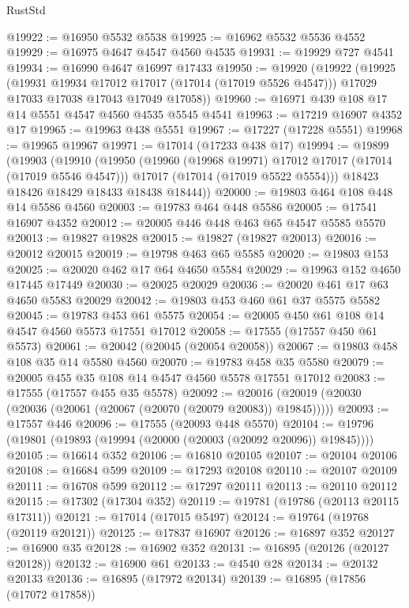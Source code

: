 \begin{lexlean}{RustStd}
\begin{coremodule}
{\begin{coremodule}
{{{{{{{{{{{{{{{{{{{{{{{{{{{{{{{{{{{{{{{{{{{{{{{{{{{{{{{@19922 := @16950 @5532 @5538
@19925 := @16962 @5532 @5536 @4552
@19929 := @16975 @4647 @4547 @4560 @4535
@19931 := @19929 @727 @4541
@19934 := @16990 @4647 @16997 @17433
@19950 := @19920
    (@19922
      (@19925
        (@19931 @19934 @17012 @17017 (@17014 (@17019 @5526 @4547)))
        @17029
        @17033
        @17038
        @17043
        @17049
        @17058))
@19960 := @16971 @439 @108 @17 @14 @5551 @4547 @4560 @4535 @5545 @4541
@19963 := @17219 @16907 @4352 @17
@19965 := @19963 @438 @5551
@19967 := @17227 (@17228 @5551)
@19968 := @19965 @19967
@19971 := @17014 (@17233 @438 @17)
@19994 := @19899
    (@19903
      (@19910
        (@19950
          (@19960 (@19968 @19971) @17012 @17017 (@17014 (@17019 @5546 @4547)))
          @17017
          (@17014 (@17019 @5522 @5554)))
        @18423
        @18426
        @18429
        @18433
        @18438
        @18444))
@20000 := @19803 @464 @108 @448 @14 @5586 @4560
@20003 := @19783 @464 @448 @5586
@20005 := @17541 @16907 @4352
@20012 := @20005 @446 @448 @463 @65 @4547 @5585 @5570
@20013 := @19827 @19828
@20015 := @19827 (@19827 @20013)
@20016 := @20012 @20015
@20019 := @19798 @463 @65 @5585
@20020 := @19803 @153
@20025 := @20020 @462 @17 @64 @4650 @5584
@20029 := @19963 @152 @4650 @17445 @17449
@20030 := @20025 @20029
@20036 := @20020 @461 @17 @63 @4650 @5583 @20029
@20042 := @19803 @453 @460 @61 @37 @5575 @5582
@20045 := @19783 @453 @61 @5575
@20054 := @20005 @450 @61 @108 @14 @4547 @4560 @5573 @17551 @17012
@20058 := @17555 (@17557 @450 @61 @5573)
@20061 := @20042 (@20045 (@20054 @20058))
@20067 := @19803 @458 @108 @35 @14 @5580 @4560
@20070 := @19783 @458 @35 @5580
@20079 := @20005 @455 @35 @108 @14 @4547 @4560 @5578 @17551 @17012
@20083 := @17555 (@17557 @455 @35 @5578)
@20092 := @20016 (@20019 (@20030 (@20036 (@20061 (@20067 (@20070 (@20079 @20083)) @19845)))))
@20093 := @17557 @446
@20096 := @17555 (@20093 @448 @5570)
@20104 := @19796 (@19801 (@19893 (@19994 (@20000 (@20003 (@20092 @20096)) @19845))))
@20105 := @16614 @352
@20106 := @16810 @20105
@20107 := @20104 @20106
@20108 := @16684 @599
@20109 := @17293 @20108
@20110 := @20107 @20109
@20111 := @16708 @599
@20112 := @17297 @20111
@20113 := @20110 @20112
@20115 := @17302 (@17304 @352)
@20119 := @19781 (@19786 (@20113 @20115 @17311))
@20121 := @17014 (@17015 @5497)
@20124 := @19764 (@19768 (@20119 @20121))
@20125 := @17837 @16907
@20126 := @16897 @352
@20127 := @16900 @35
@20128 := @16902 @352
@20131 := @16895 (@20126 (@20127 @20128))
@20132 := @16900 @61
@20133 := @4540 @28
@20134 := @20132 @20133
@20136 := @16895 (@17972 @20134)
@20139 := @16895 (@17856 (@17072 @17858))
}}}}}}}}}}}}}}}}}}}}}}}}}}}}}}}}}}}}}}}}}}}}}}}}}}}}}}}
\end{coremodule}}
\end{coremodule}
\end{lexlean}
